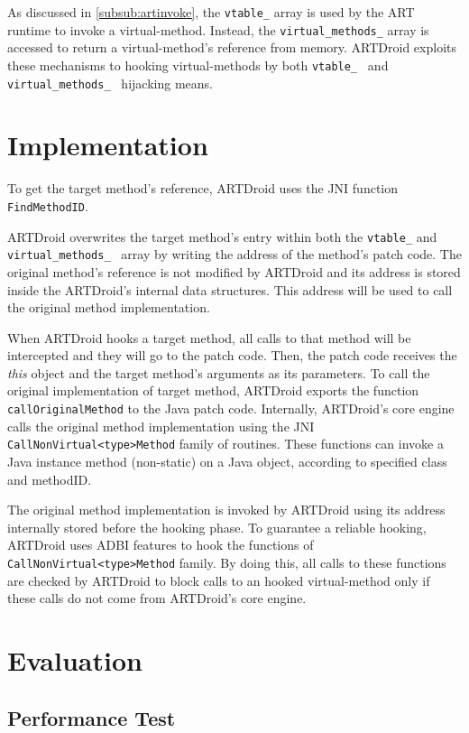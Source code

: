 As discussed in \ref{subsub:artinvoke}, the {\tt vtable\_} array is used by the ART runtime to invoke a virtual-method. Instead, the {\tt virtual\_methods\_} array is accessed to return a virtual-method’s reference from memory. ARTDroid exploits these mechanisms to hooking virtual-methods by both {\tt vtable\_ } and {\tt virtual\_methods\_ } hijacking means.



\section{Implementation}
\label{sec:impl}
To get the target method's reference, ARTDroid uses the JNI  function {\tt FindMethodID}. 


ARTDroid overwrites the target method's entry within both the {\tt vtable\_} and {\tt virtual\_methods\_ } array by writing the address of the method's patch code. The original method's reference is not modified by ARTDroid and its address is stored inside the ARTDroid's internal data structures. This address will be used to call the original method implementation. 


When ARTDroid hooks a target method, all calls to that method will be intercepted and they will go to the patch code. Then, the patch code receives the \textit{this} object and the target method's arguments as its parameters. To call the original implementation of target method, ARTDroid exports the function {\tt callOriginalMethod} to the Java patch code. Internally, ARTDroid's core engine calls the original method implementation using the JNI {\tt CallNonVirtual<type>Method} family of routines. These functions can invoke a Java instance method (non-static) on a Java object, according to specified class and methodID.

The original method implementation is invoked by ARTDroid using its address internally stored  before the hooking phase. To guarantee a reliable hooking, ARTDroid uses ADBI features to hook the functions of {\tt CallNonVirtual<type>Method} family. By doing this, all calls to these functions are checked by ARTDroid to block calls to an hooked virtual-method only if these calls do not come from ARTDroid's core engine.


\section{Evaluation}
\label{sec:eva}

\subsection{Performance Test}

